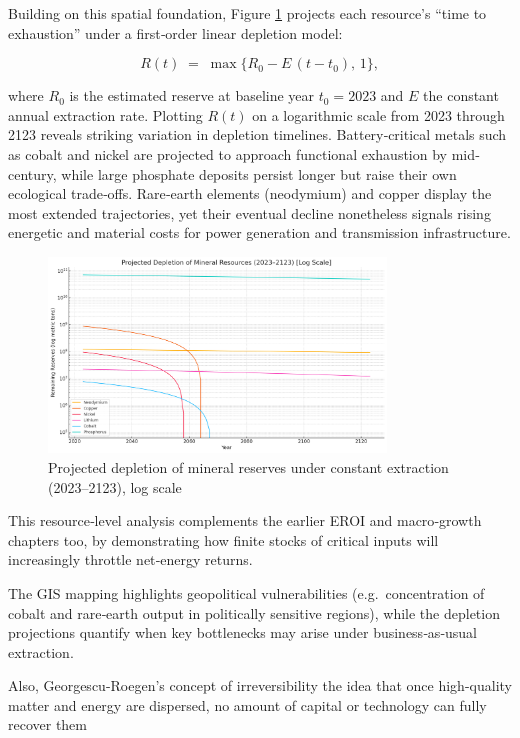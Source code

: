 \documentclass[a4paper,12pt]{article}
\begin{document}
Building on this spatial foundation, Figure \ref{fig:depletion-chart} projects each resource’s “time to exhaustion” under a first‐order linear depletion model:

\[
  R(t) \;=\;\max\bigl\{R_{0} - E\,(t - t_{0}),\,1\bigr\},
\]

where \(R_{0}\) is the estimated reserve at baseline year \(t_{0} = 2023\) and \(E\) the constant annual extraction rate.  Plotting \(R(t)\) on a logarithmic scale from 2023 through 2123 reveals striking variation in depletion timelines.  Battery‐critical metals such as cobalt and nickel are projected to approach functional exhaustion by mid‐century, while large phosphate deposits persist longer but raise their own ecological trade‐offs.  Rare‐earth elements (neodymium) and copper display the most extended trajectories, yet their eventual decline nonetheless signals rising energetic and material costs for power generation and transmission infrastructure.

\begin{figure}[H]
  \centering
  \includegraphics[width=0.8\textwidth]{figures/resource_depletion_chart.png}
  \caption{Projected depletion of mineral reserves under constant extraction (2023–2123), log scale}
  \label{fig:depletion-chart}
\end{figure}

This resource‐level analysis complements the earlier EROI and macro‐growth chapters too, by demonstrating how finite stocks of critical inputs will increasingly throttle net‐energy returns.  

The GIS mapping highlights geopolitical vulnerabilities (e.g.\ concentration of cobalt and rare‐earth output in politically sensitive regions), while the depletion projections quantify when key bottlenecks may arise under business‐as‐usual extraction. 

Also, Georgescu-Roegen’s concept of irreversibility the idea that once high-quality matter and energy are dispersed, no amount of capital or technology can fully recover them
\end{document}
